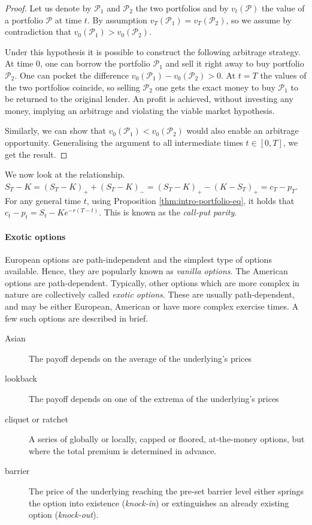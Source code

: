 \begin{proof}
	Let us denote by $ \mathcal{P}_1 $ and $ \mathcal{P}_2 $ the two portfolios and by $ v_t(\mathcal{P}) $ the value of a portfolio $ \mathcal{P} $ at time $ t $. By assumption $ v_T (\mathcal{P}_1) = v_T (\mathcal{P}_2) $, so we assume by contradiction that $ v_0 (\mathcal{P}_1) > v_0 (\mathcal{P}_2) $.
	
	Under this hypothesis it is possible to construct the following arbitrage strategy. At time 0, one can borrow the portfolio $ \mathcal{P}_1 $ and sell it right away to buy portfolio $ \mathcal{P}_2 $. One can pocket the difference $ v_0 (\mathcal{P}_1) - v_0 (\mathcal{P}_2) > 0 $. At $ t = T $ the values of the two portfolios coincide, so selling $ \mathcal{P}_2 $ one gets the exact money to buy $ \mathcal{P}_1 $ to be returned to the original lender. An profit is achieved, without investing any money, implying an arbitrage and violating the viable market hypothesis.
	
	Similarly, we can show that $ v_0 (\mathcal{P}_1) < v_0 (\mathcal{P}_2) $ would also enable an arbitrage opportunity. Generalising the argument to all intermediate times $ t \in [0, T] $, we get the result.
\end{proof}

We now look at the relationship. $ S_T - K = (S_T - K)_+ + (S_T - K)_- = (S_T - K)_+ - (K - S_T)_+ = c_T - p_T $. For any general time $ t $, using Proposition \ref{thm:intro-portfolio-eq}, it holds that $ c_t - p_t = S_t - K e^{- r (T-t) } $. This is known as the \emph{call-put parity}.


\paragraph{Exotic options}
European options are path-independent and the simplest type of options available. Hence, they are popularly known as \emph{vanilla options}. The American options are path-dependent. Typically, other options which are more complex in nature are collectively called \emph{exotic options}. These are usually path-dependent, and may be either European, American or have more complex exercise times. A few such options are described in brief.
\begin{description}
	\item[Asian] The payoff depends on the average of the underlying's prices
	\item[lookback] The payoff depends on one of the extrema of the underlying's prices
	\item[cliquet or ratchet] A series of globally or locally, capped or floored, at-the-money options, but where the total premium is determined in advance.
	\item[barrier] The price of the underlying reaching the pre-set barrier level either springs the option into existence (\emph{knock-in}) or extinguishes an already existing option (\emph{knock-out}).
\end{description}



